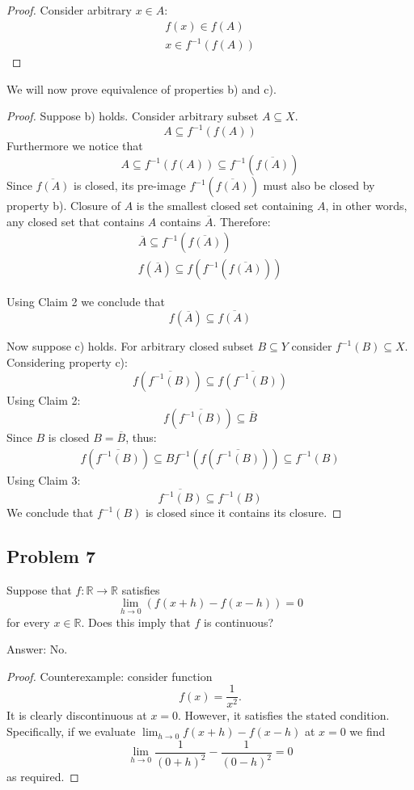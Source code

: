 \documentclass{article}
\newcommand{\R}{\mathbb{R}}
\theoremstyle{remark}
\begin{document}
\begin{proof}

Consider arbitrary $x \in A$:
\begin{gather*}
    f(x) \in f(A) \\
    x \in f^{-1}(f(A))    
\end{gather*}

\end{proof}

We will now prove equivalence of properties b) and c).

\begin{proof}

Suppose b) holds. Consider arbitrary subset $A \subseteq X$. 
\[ A \subseteq f^{-1}(f(A)) \]
Furthermore we notice that
\[ A \subseteq f^{-1}(f(A)) \subseteq f^{-1}(\overline{f(A)}) \]
Since $\overline{f(A)}$ is closed, its pre-image $f^{-1}(\overline{f(A)})$ must also be closed by property b).
Closure of $A$ is the smallest closed set containing $A$, in other words, any closed set that contains $A$ contains $\overline{A}$.
Therefore:
\begin{gather*}
    \overline{A} \subseteq f^{-1}(\overline{f(A)}) \\
    f(\overline{A}) \subseteq f(f^{-1}(\overline{f(A)}))
\end{gather*}

Using Claim 2 we conclude that
\[ f(\overline{A}) \subseteq \overline{f(A)} \]

Now suppose c) holds.
For arbitrary closed subset $B \subseteq Y$ consider $f^{-1}(B) \subseteq X$. Considering property c):
\[ f(\overline{f^{-1}(B)}) \subseteq \overline{f(f^{-1}(B))} \]
Using Claim 2:
\[ f(\overline{f^{-1}(B)}) \subseteq \overline{B} \]
Since $B$ is closed $B = \overline{B}$, thus:
\begin{gather*}
    f(\overline{f^{-1}(B)}) \subseteq B
    f^{-1}(f(\overline{f^{-1}(B)})) \subseteq f^{-1}(B)
\end{gather*}
Using Claim 3:
\[ \overline{f^{-1}(B)} \subseteq f^{-1}(B) \]
We conclude that $f^{-1}(B)$ is closed since it contains its closure.

\end{proof}


\subsection*{Problem 7}

\begin{tcolorbox}
Suppose that $f : \R \to \R$ satisfies
\[ \lim_{h \to 0} (f(x+h)-f(x-h)) = 0 \]
for every $x \in \R$. Does this imply that $f$ is continuous?
\end{tcolorbox}

Answer: No.

\begin{proof}

Counterexample: consider function
\[ f(x) = \frac{1}{x^2}. \]
It is clearly discontinuous at $x=0$.
However, it satisfies the stated condition.
Specifically, if we evaluate $\lim_{h \to 0} f(x+h)-f(x-h)$ at $x=0$ we find
\[ \lim_{h \to 0} \frac{1}{(0+h)^2} - \frac{1}{(0-h)^2} = 0 \]
as required.

\end{proof}
\end{document}
